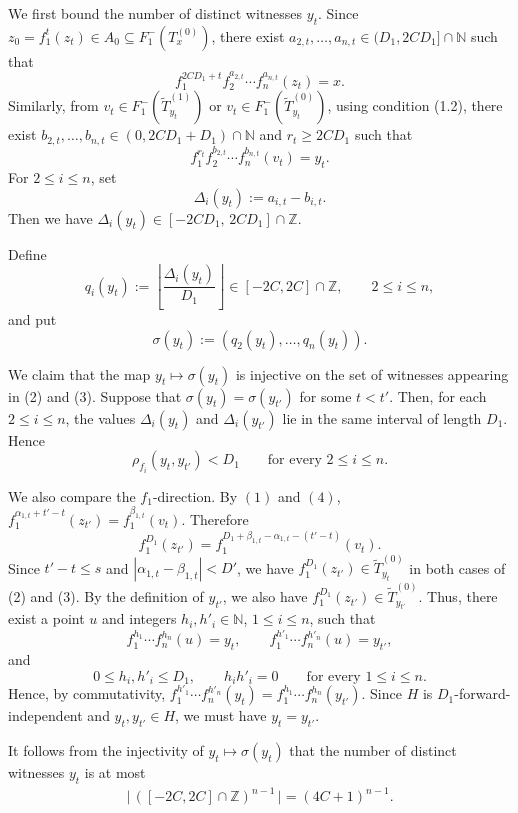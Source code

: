 \documentclass[11pt, reqno, a4paper]{amsart}
\theoremstyle{definition}
\theoremstyle{plain}
\begin{document}
We first bound the number of distinct witnesses $y_t$. Since
$z_0=f_1^t(z_t)\in A_0\subseteq F_1^-(T_x^{(0)})$,
there exist
$a_{2,t},\ldots,a_{n,t}\in (D_1,2CD_1]\cap \mathbb{N}$
such that
$$
f_1^{2CD_1+t} f_2^{a_{2,t}}\cdots f_n^{a_{n,t}}(z_t)=x.
$$
Similarly, from $v_t\in F_1^-(\widetilde T_{y_t}^{(1)})$ or $v_t\in F_1^-(\widetilde T_{y_t}^{(0)})$, using condition \textup{(1.2)}, there exist
$b_{2,t},\ldots,b_{n,t}\in (0,2CD_1+D_1)\cap\mathbb N$
and $r_t\ge 2CD_1$ such that
$$
f_1^{r_t} f_2^{b_{2,t}}\cdots f_n^{b_{n,t}}(v_t)=y_t.
$$
For $2\le i\le n$, set
$$
\Delta_i(y_t):=a_{i,t}-b_{i,t}.
$$
Then we have $\Delta_i(y_t)\in [-2CD_1,\,2CD_1]\cap \mathbb{Z}$.

Define
$$
q_i(y_t):=\left\lfloor\frac{\Delta_i(y_t)}{D_1}\right\rfloor
\in [-2C, 2C]\cap \mathbb{Z},
\qquad 2\le i\le n,
$$
and put
$$
\sigma(y_t):=(q_2(y_t),\ldots,q_n(y_t)).
$$

We claim that the map
$y_t\longmapsto \sigma(y_t)$
is injective on the set of witnesses appearing in (2) and (3). Suppose that
$\sigma(y_t)=\sigma(y_{t'})$
for some $t<t'$. Then, for each $2\le i\le n$, the values
$\Delta_i(y_t)$ and $\Delta_i(y_{t'})$ lie in the same interval of length
$D_1$. Hence
$$
\rho_{f_i}(y_t,y_{t'})<D_1
\qquad\text{for every }2\le i\le n.
$$

We also compare the $f_1$-direction. By $(1)$ and $(4)$,
$f_1^{\alpha_{1,t}+t'-t}(z_{t'})=f_1^{\beta_{1,t}}(v_t)$.
Therefore
$$
f_1^{D_1}(z_{t'})
=
f_1^{D_1+\beta_{1,t}-\alpha_{1,t}-(t'-t)}(v_t).
$$
Since
$t'-t\le s$ and $|\alpha_{1,t}-\beta_{1,t}|<D'$, we have 
$f_1^{D_1}(z_{t'})\in \widetilde T_{y_t}^{(0)}$ in both cases of (2) and (3). By the definition of $y_{t'}$, we also have
$f_1^{D_1}(z_{t'})\in \widetilde T_{y_{t'}}^{(0)}$. Thus, there exist a point $u$ and
integers $h_i,h'_i\in\mathbb N$, $1\le i\le n$, such that
$$
f_1^{h_1}\cdots f_n^{h_n}(u)=y_t,
\qquad
f_1^{h'_1}\cdots f_n^{h'_n}(u)=y_{t'},
$$
and
$$
0\le h_i,h'_i\leq D_1,
\qquad
h_ih'_i=0
\qquad\text{for every }1\le i\le n.
$$
Hence, by commutativity,
$f_1^{h'_1}\cdots f_n^{h'_n}(y_t)
=
f_1^{h_1}\cdots f_n^{h_n}(y_{t'})$.
Since $H$ is $D_1$-forward-independent and $y_t,y_{t'}\in H$, we must have
$y_t=y_{t'}$. 

It follows from the injectivity of $y_t\mapsto \sigma(y_t)$ that the
number of distinct witnesses $y_t$ is at most 
\begin{align}
    \bigl|\,([-2C, 2C]\cap \mathbb{Z})^{n-1}\,\bigr|=(4C+1)^{n-1}.
\tag{5}
\end{align}
\end{document}
